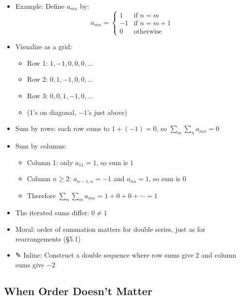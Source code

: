 \documentclass[
  10pt,
  letterpaper,
]{scrbook}
\providecommand{\tightlist}{%
  \setlength{\itemsep}{0pt}\setlength{\parskip}{0pt}}
\begin{document}
\begin{itemize}
\tightlist
\item
  Example: Define \(a_{mn}\) by:
  \[a_{mn} = \begin{cases} 1 & \text{if } n = m \\ -1 & \text{if } n = m + 1 \\ 0 & \text{otherwise} \end{cases}\]
\item
  Visualize as a grid:

  \begin{itemize}
  \tightlist
  \item
    Row 1: \(1, -1, 0, 0, 0, \ldots\)
  \item
    Row 2: \(0, 1, -1, 0, 0, \ldots\)
  \item
    Row 3: \(0, 0, 1, -1, 0, \ldots\)
  \item
    (1's on diagonal, \(-1\)'s just above)
  \end{itemize}
\item
  Sum by rows: each row sums to \(1 + (-1) = 0\), so
  \(\sum_m \sum_n a_{mn} = 0\)
\item
  Sum by columns:

  \begin{itemize}
  \tightlist
  \item
    Column 1: only \(a_{11} = 1\), so sum is \(1\)
  \item
    Column \(n \geq 2\): \(a_{n-1,n} = -1\) and \(a_{nn} = 1\), so sum
    is \(0\)
  \item
    Therefore \(\sum_n \sum_m a_{mn} = 1 + 0 + 0 + \cdots = 1\)
  \end{itemize}
\item
  The iterated sums differ: \(0 \neq 1\)
\item
  Moral: order of summation matters for double series, just as for
  rearrangements (§5.1)
\item
  ✎ Inline: Construct a double sequence where row sums give \(2\) and
  column sums give \(-2\)
\end{itemize}

\subsection{When Order Doesn't Matter}\label{when-order-doesnt-matter}
\end{document}
